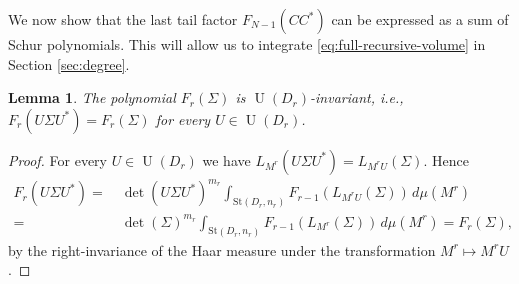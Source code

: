 \documentclass{article}
\newtheorem{lemma}[theorem]{Lemma}
\theoremstyle{definition}
\DeclareMathOperator{\U}{U}
\newcommand{\St}{\mathrm{St}}
\begin{document}
We now show that the last tail factor $F_{N-1}(CC^*)$ can be expressed as a sum of Schur polynomials. This will allow us to integrate \eqref{eq:full-recursive-volume} in Section \ref{sec:degree}. \\

\begin{lemma}\label{lemma:F_r_invariance}
    The polynomial $F_r(\Sigma)$ is $\U(D_r)$-invariant, i.e., $F_r(U\Sigma U^*)=F_r(\Sigma)$ for every $U \in \U(D_r)$.
\end{lemma}
\begin{proof}
    For every $U \in \U(D_r)$ we have $L_{M^r}(U\Sigma U^*) = L_{M^rU}(\Sigma)$. Hence 
    \begin{align*}
        F_r(U\Sigma U^*) =& \ \det(U\Sigma U^*)^{m_r}\int_{\St(D_r,n_r)}
F_{r-1}\!\left(
L_{M^r U}(\Sigma)
\right)\,d\mu(M^r) \\=& \ \det(\Sigma)^{m_r}\int_{\St(D_r,n_r)}
F_{r-1}\!\left(
L_{M^r}(\Sigma)
\right)\,d\mu(M^r) = F_r(\Sigma),
    \end{align*}
by the right-invariance of the Haar measure under the transformation $M^r \mapsto M^rU$. 
\end{proof}
\end{document}
